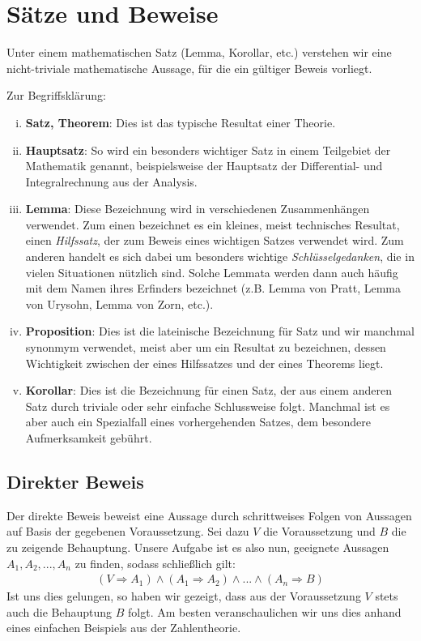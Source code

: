 \section{Sätze und Beweise}

Unter einem mathematischen Satz (Lemma, Korollar, etc.) verstehen wir eine
nicht-triviale mathematische Aussage, für die ein gültiger Beweis vorliegt.

\begin{remark}
    Zur Begriffsklärung:
    \begin{enumerate}[(i)]
        \item
        \textbf{Satz, Theorem}: Dies ist das typische Resultat einer Theorie.
        \item
        \textbf{Hauptsatz}: So wird ein besonders wichtiger Satz in einem Teilgebiet der Mathematik
        genannt, beispielsweise der Hauptsatz der Differential- und Integralrechnung aus der Analysis.
        \item
        \textbf{Lemma}:
        Diese Bezeichnung wird in verschiedenen Zusammenhängen verwendet. Zum einen bezeichnet es
        ein kleines, meist technisches Resultat, einen \textit{Hilfssatz}, der zum Beweis eines wichtigen
        Satzes verwendet wird. Zum anderen handelt es sich dabei um besonders wichtige \textit{Schlüsselgedanken},
        die in vielen Situationen nützlich sind. Solche Lemmata werden dann auch häufig mit dem Namen ihres Erfinders bezeichnet
        (z.B. Lemma von Pratt, Lemma von Urysohn, Lemma von Zorn, etc.).
        \item
        \textbf{Proposition}:
        Dies ist die lateinische Bezeichnung für Satz und wir manchmal synonmym verwendet,
        meist aber um ein Resultat zu bezeichnen, dessen Wichtigkeit zwischen der eines Hilfssatzes
        und der eines Theorems liegt.
        \item
        \textbf{Korollar}:
        Dies ist die Bezeichnung für einen Satz, der aus einem anderen Satz durch triviale oder sehr einfache
        Schlussweise folgt. Manchmal ist es aber auch ein Spezialfall eines vorhergehenden Satzes, dem besondere Aufmerksamkeit gebührt.
    \end{enumerate}

\end{remark}

\subsection{Direkter Beweis}
Der direkte Beweis beweist eine Aussage durch schrittweises Folgen von Aussagen
auf Basis der gegebenen Voraussetzung.
Sei dazu $V$ die Voraussetzung und $B$ die zu zeigende Behauptung.
Unsere Aufgabe ist es also nun, geeignete Aussagen $A_1, A_2,...,A_n$ zu finden,
sodass schließlich gilt:
\begin{align*}
    (V \Rightarrow A_1) \wedge (A_1 \Rightarrow A_2) \wedge ... \wedge (A_n \Rightarrow B)
\end{align*}
Ist uns dies gelungen, so haben wir gezeigt, dass aus der Voraussetzung $V$
stets auch die Behauptung $B$ folgt.
Am besten veranschaulichen wir uns dies anhand eines einfachen Beispiels aus
der Zahlentheorie.


